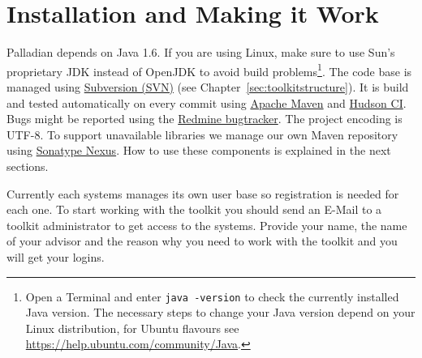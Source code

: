 \documentclass[a4paper,twoside]{book}      %
\begin{document}
\chapter{Installation and Making it Work}
Palladian depends on Java 1.6. If you are using Linux, make sure to use Sun's proprietary JDK instead of OpenJDK to avoid build problems\footnote{Open a Terminal and enter \texttt{java -version} to check the currently installed Java version. The necessary steps to change your Java version depend on your Linux distribution, for Ubuntu flavours see \url{https://help.ubuntu.com/community/Java}.}. The code base is managed using \href{http://subversion.apache.org/}{Subversion (SVN)} (see Chapter~\ref{sec:toolkitstructure}). It is build and tested automatically on every commit using \href{http://maven.apache.org/}{Apache Maven} and \href{http://hudson-ci.org/}{Hudson CI}. Bugs might be reported using the \href{http://www.redmine.org/}{Redmine bugtracker}. The project encoding is UTF-8. To support unavailable libraries we manage our own Maven repository using \href{http://nexus.sonatype.org/}{Sonatype Nexus}. How to use these components is explained in the next sections.

Currently each systems manages its own user base so registration is needed for each one. To start working with the toolkit you should send an E-Mail to a toolkit administrator to get access to the systems. Provide your name, the name of your advisor and the reason why you need to work with the toolkit and you will get your logins.
\end{document}
